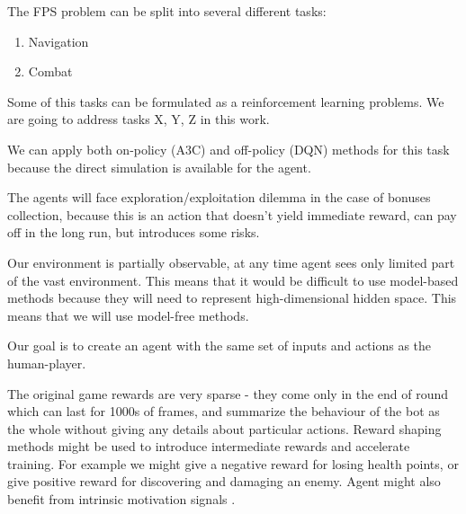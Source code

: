 The FPS problem can be split into several different tasks:
\begin{enumerate}
    \item Navigation
    \item Combat
\end{enumerate}

Some of this tasks can be formulated as a reinforcement learning problems.
We are going to address tasks X, Y, Z in this work.


We can apply both on-policy (A3C) and off-policy (DQN) methods for this task because the direct simulation is available for the agent.

The agents will face exploration/exploitation dilemma in the case of bonuses collection, because this is an action that doesn't yield immediate reward, can pay off in the long run, but introduces some risks.

Our environment is partially observable, at any time agent sees only limited part of the vast environment. This means that it would be difficult to use model-based methods because they will need to represent high-dimensional hidden space. This means that we will use model-free methods.

Our goal is to create an agent with the same set of inputs and actions as the human-player.


The original game rewards are very sparse - they come only in the end of round which can last for 1000s of frames, and summarize the behaviour of the bot as the whole without giving any details about particular actions.
Reward shaping \cite{RewardShaping} methods might be used to introduce intermediate rewards and accelerate training. For example we might give a negative reward for losing health points, or give positive reward for discovering and damaging an enemy.
Agent might also benefit from intrinsic motivation signals \cite{IntrinsicMotivation}.

